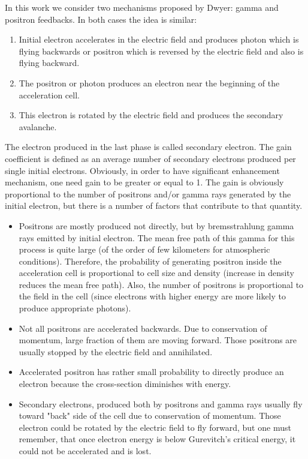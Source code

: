 \documentclass[utf8]{webofc}
\begin{document}
    In this work we consider two mechanisms proposed by Dwyer: gamma and positron feedbacks. 
    In both cases the idea is similar:
    \begin{enumerate}
        
        \item Initial electron accelerates in the electric field and produces photon which is flying backwards or positron which is reversed by the electric field and also is flying backward.
        
        \item The positron or photon produces an electron near the beginning of the acceleration cell.
        
        \item This electron is rotated by the electric field and produces the secondary avalanche. 
        
    \end{enumerate}
    
    The electron produced in the last phase is called secondary electron. The gain coefficient is defined as an average number of secondary electrons produced per single initial electrons. Obviously, in order to have significant enhancement mechanism, one need gain to be greater or equal to 1. 
    The gain is obviously proportional to the number of positrons and/or gamma rays generated by the initial electron, but there is a number of factors that contribute to that quantity.
    
    \begin{itemize}
        \item Positrons are mostly produced not directly, but by bremsstrahlung gamma rays emitted by initial electron. The mean free path of this gamma for this process is quite large (of the order of few kilometers for atmospheric conditions). Therefore, the probability of generating positron inside the acceleration cell is proportional to cell size and density (increase in density reduces the mean free path). Also, the number of positrons is proportional to the field in the cell (since electrons with higher energy are more likely to produce appropriate photons).
        \item Not all positrons are accelerated backwards. Due to conservation of momentum, large fraction of them are moving forward. Those positrons are usually stopped by the electric field and annihilated.
        \item Accelerated positron has rather small probability to directly produce an electron because the cross-section diminishes with energy.
        \item Secondary electrons, produced both by positrons and gamma rays usually fly toward "back" side of the cell due to conservation of momentum. Those electron could be rotated by the electric field to fly forward, but one must remember, that once electron energy is below Gurevitch's critical energy, it could not be accelerated and is lost.
    \end{itemize}
    
\end{document}

